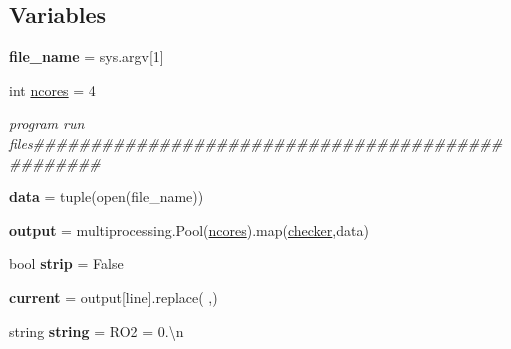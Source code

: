 \subsection*{Variables}
\begin{DoxyCompactItemize}
\item 
\mbox{\label{namespacelarge__mechanisms_aa112d470983fd10068918dad86bd3aba}} 
{\bfseries file\+\_\+name} = sys.\+argv\mbox{[}1\mbox{]}
\item 
\mbox{\label{namespacelarge__mechanisms_a7d373bd920760bab376b4e8627c04061}} 
int \mbox{\hyperlink{namespacelarge__mechanisms_a7d373bd920760bab376b4e8627c04061}{ncores}} = 4
\begin{DoxyCompactList}\small\item\em program run files\#\#\#\#\#\#\#\#\#\#\#\#\#\#\#\#\#\#\#\#\#\#\#\#\#\#\#\#\#\#\#\#\#\#\#\#\#\#\#\#\#\#\#\#\#\#\#\#\# \end{DoxyCompactList}\item 
\mbox{\label{namespacelarge__mechanisms_a9faa0bf477b6d91f4363514a57f70493}} 
{\bfseries data} = tuple(open(file\+\_\+name))
\item 
\mbox{\label{namespacelarge__mechanisms_ab5e309d41d9e071d10a36e2c6be530e1}} 
{\bfseries output} = multiprocessing.\+Pool(\mbox{\hyperlink{namespacelarge__mechanisms_a7d373bd920760bab376b4e8627c04061}{ncores}}).map(\mbox{\hyperlink{namespacelarge__mechanisms_a0ddf139537a04e726bf373f07449b941}{checker}},data)
\item 
\mbox{\label{namespacelarge__mechanisms_a87e9ab8ea5f68a6202f1b425bc920fb3}} 
bool {\bfseries strip} = False
\item 
\mbox{\label{namespacelarge__mechanisms_a484a7c56287702f84f99fcd06e4cf846}} 
{\bfseries current} = output\mbox{[}line\mbox{]}.replace(\textquotesingle{} \textquotesingle{},\textquotesingle{}\textquotesingle{})
\item 
\mbox{\label{namespacelarge__mechanisms_a111c6b81ce392fafdbf68185ff63271c}} 
string {\bfseries string} = \textquotesingle{}R\+O2 = 0.\textbackslash{}n\textquotesingle{}

\end{DoxyCompactItemize}
